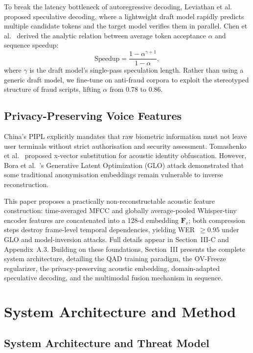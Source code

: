 \documentclass[lettersize,journal]{IEEEtran}
\begin{document}
To break the latency bottleneck of autoregressive decoding, Leviathan et al.~\cite{20} proposed speculative decoding, where a lightweight draft model rapidly predicts multiple candidate tokens and the target model verifies them in parallel. Chen et al.~\cite{21} derived the analytic relation between average token acceptance $\alpha$ and sequence speedup:
\begin{equation}
\label{eq:speedup}
\text{Speedup} = \frac{1-\alpha^{\gamma+1}}{1-\alpha},
\end{equation}
where $\gamma$ is the draft model's single-pass speculation length. Rather than using a generic draft model, we fine-tune on anti-fraud corpora to exploit the stereotyped structure of fraud scripts, lifting $\alpha$ from 0.78 to 0.86.

\subsection{Privacy-Preserving Voice Features}

China's PIPL explicitly mandates that raw biometric information must not leave user terminals without strict authorisation and security assessment. Tomashenko et al.~\cite{22} proposed x-vector substitution for acoustic identity obfuscation. However, Bora et al.~\cite{23}'s Generative Latent Optimization (GLO) attack demonstrated that some traditional anonymisation embeddings remain vulnerable to inverse reconstruction.

This paper proposes a practically non-reconstructable acoustic feature construction: time-averaged MFCC and globally average-pooled Whisper-tiny encoder features are concatenated into a 128-d embedding $\bm{F}_v$; both compression steps destroy frame-level temporal dependencies, yielding WER~$\ge 0.95$ under GLO and model-inversion attacks. Full details appear in Section~III-C and Appendix~A.3. Building on these foundations, Section~III presents the complete system architecture, detailing the QAD training paradigm, the OV-Freeze regularizer, the privacy-preserving acoustic embedding, domain-adapted speculative decoding, and the multimodal fusion mechanism in sequence.

\section{System Architecture and Method}
\subsection{System Architecture and Threat Model}
\end{document}
